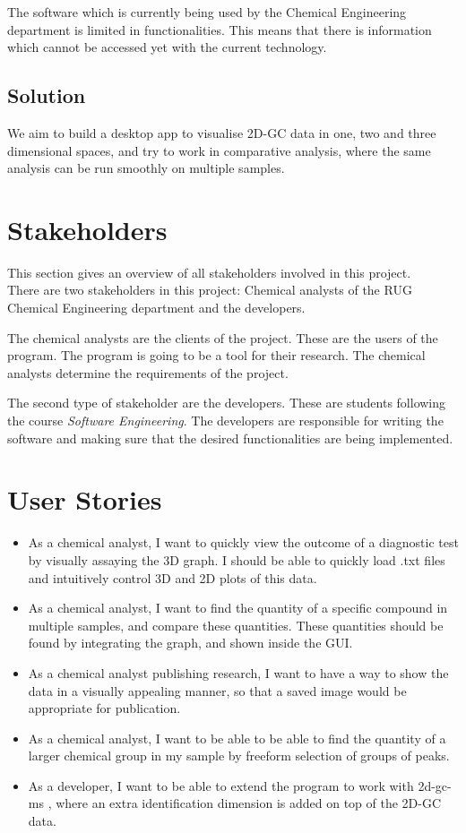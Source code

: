 \documentclass{article}
\begin{document}
The software which is currently being used by the Chemical Engineering department is limited in functionalities. This means that there is information which cannot be accessed yet with the current technology. 

\subsection{Solution}
We aim to build a desktop app to visualise 2D-GC data in one, two and three dimensional spaces, and try to work in comparative analysis, where the same analysis can be run smoothly on multiple samples. 

\section{Stakeholders}

This section gives an overview of all stakeholders involved in this project. \\

\noindent There are two stakeholders in this project: Chemical analysts of the RUG Chemical Engineering department and the developers.

The chemical analysts are the clients of the project. These are the users of the program. The program is going to be a tool for their research. The chemical analysts determine the requirements of the project.

The second type of stakeholder are the developers. These are students following the course \textit{Software Engineering}. The developers are responsible for writing the software and making sure that the desired functionalities are being implemented.

\section{User Stories}
\begin{itemize}
	\item As a chemical analyst, I want to quickly view the outcome of a diagnostic test by visually assaying the 3D graph. I should be able to quickly load .txt files and intuitively control 3D and 2D plots of this data.
	\item As a chemical analyst, I want to find the quantity of a specific compound in multiple samples, and compare these quantities. These quantities should be found by integrating the graph, and shown inside the GUI.
	\item As a chemical analyst publishing research, I want to have a way to show the data in a visually appealing manner, so that a saved image would be appropriate for publication. 
	\item As a chemical analyst, I want to be able to be able to find the quantity of a larger chemical group in my sample by freeform selection of groups of peaks. 
	\item As a developer, I want to be able to extend the program to work with \acrfull{2d-gc-ms} , where an extra identification dimension is added on top of the 2D-GC data. 
\end{itemize}
\end{document}
